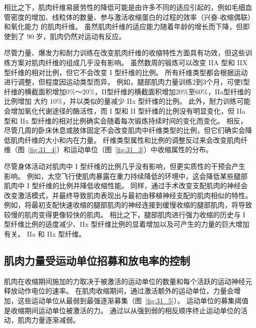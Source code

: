 相比之下，肌肉纤维易疲劳性的降低可能是由许多不同的适应引起的，例如毛细血管密度的增加、线粒体的数量、参与激活收缩蛋白的过程的效率（兴奋-收缩偶联）和氧化能力 的肌肉纤维。
虽然肌肉纤维的适应能力随着年龄的增长而下降，但即使到了 90 岁，肌肉仍然对运动有反应。


尽管力量、爆发力和耐力训练在改变肌肉纤维的收缩特性方面具有功效，但这些训练方案对肌肉纤维的组成几乎没有影响。
虽然数周的锻炼可以改变 IIA 型和 IIX 型纤维的相对比例，但它不会改变 I 型纤维的比例。
所有纤维类型都会根据运动进行调整，但程度因运动类型而异。
例如，腿部肌肉力量训练2到3个月，可使I型纤维的横截面积增加0\%～20\%，II型纤维的横截面积增加20\%至60\%，IIa型纤维的比例增加 大约 10\%，并以类似的量减少 IIx 型纤维的比例。
此外，耐力训练可能会增加氧化代谢途径的酶活性，而 I 型和 II 型纤维的比例没有明显变化，但 IIa 型和 IIx 型纤维的相对比例确实会随着每次锻炼持续时间的变化而变化。
相反，尽管几周的卧床休息或肢体固定不会改变肌肉中纤维类型的比例，但它们确实会降低肌肉纤维的大小和内在力量。
纤维类型属性和比例的调整反过来会改变肌肉纤维（图~\ref{fig:31_4}）和运动单位（图~\ref{fig:31_3}）中收缩属性的分布。


尽管身体活动对肌肉中 I 型纤维的比例几乎没有影响，但更实质性的干预会产生影响。
例如，太空飞行使肌肉暴露在重力持续降低的环境中，这会降低某些腿部肌肉中 I 型纤维的比例并降低收缩性能。
同样，通过手术改变支配肌肉的神经会改变激活模式，并最终导致肌肉表现出与最初由移植神经支配的肌肉相似的特性。
例如，将最初支配快速收缩的腿部肌肉的神经连接到缓慢收缩的腿部肌肉，将导致较慢的肌肉变得更像较快的肌肉。
相比之下，腿部肌肉进行强力收缩的历史与 I 型纤维比例的适度减少、IIx 型纤维比例的显着增加以及可产生的力量的巨大增加有关。 
IIa 和 IIx 型纤维。



\subsection{肌肉力量受运动单位招募和放电率的控制}

肌肉在收缩期间施加的力取决于被激活的运动单位的数量和每个活跃的运动神经元释放动作电位的速率。
在肌肉收缩期间，通过激活额外的运动单位，力量会增加，这些运动单位从最弱到最强逐渐募集（图~\ref{fig:31_5}）。
运动单位的募集阈值是收缩期间运动单位被激活的力。
通过以从强到弱的相反顺序终止运动单位的活动，肌肉力量逐渐减弱。


